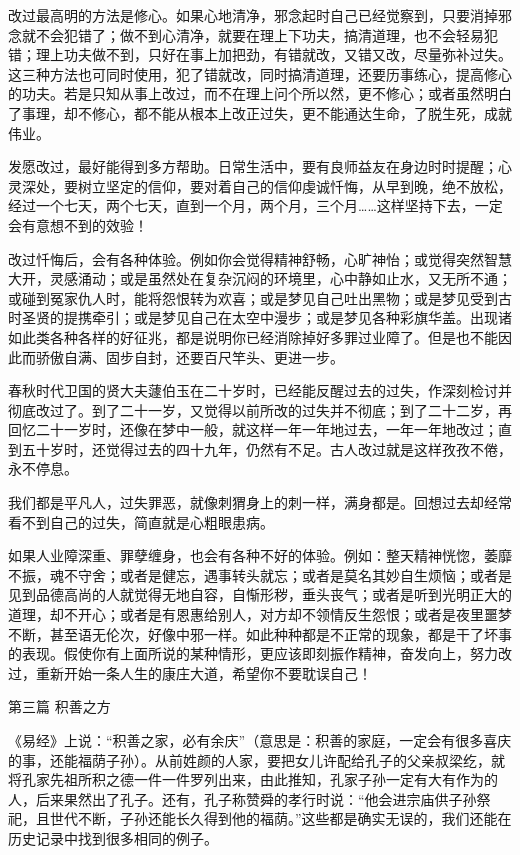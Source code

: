 \documentclass[12pt,UTF8]{ctexbook}
\begin{document}
改过最高明的方法是修心。如果心地清净，邪念起时自己已经觉察到，只要消掉邪念就不会犯错了；做不到心清净，就要在理上下功夫，搞清道理，也不会轻易犯错；理上功夫做不到，只好在事上加把劲，有错就改，又错又改，尽量弥补过失。这三种方法也可同时使用，犯了错就改，同时搞清道理，还要历事练心，提高修心的功夫。若是只知从事上改过，而不在理上问个所以然，更不修心；或者虽然明白了事理，却不修心，都不能从根本上改正过失，更不能通达生命，了脱生死，成就伟业。

发愿改过，最好能得到多方帮助。日常生活中，要有良师益友在身边时时提醒；心灵深处，要树立坚定的信仰，要对着自己的信仰虔诚忏悔，从早到晚，绝不放松，经过一个七天，两个七天，直到一个月，两个月，三个月……这样坚持下去，一定会有意想不到的效验！

改过忏悔后，会有各种体验。例如你会觉得精神舒畅，心旷神怡；或觉得突然智慧大开，灵感涌动；或是虽然处在复杂沉闷的环境里，心中静如止水，又无所不通；或碰到冤家仇人时，能将怨恨转为欢喜；或是梦见自己吐出黑物；或是梦见受到古时圣贤的提携牵引；或是梦见自己在太空中漫步；或是梦见各种彩旗华盖。出现诸如此类各种各样的好征兆，都是说明你已经消除掉好多罪过业障了。但是也不能因此而骄傲自满、固步自封，还要百尺竿头、更进一步。

春秋时代卫国的贤大夫蘧伯玉在二十岁时，已经能反醒过去的过失，作深刻检讨并彻底改过了。到了二十一岁，又觉得以前所改的过失并不彻底；到了二十二岁，再回忆二十一岁时，还像在梦中一般，就这样一年一年地过去，一年一年地改过；直到五十岁时，还觉得过去的四十九年，仍然有不足。古人改过就是这样孜孜不倦，永不停息。

我们都是平凡人，过失罪恶，就像刺猬身上的刺一样，满身都是。回想过去却经常看不到自己的过失，简直就是心粗眼患病。

如果人业障深重、罪孽缠身，也会有各种不好的体验。例如：整天精神恍惚，萎靡不振，魂不守舍；或者是健忘，遇事转头就忘；或者是莫名其妙自生烦恼；或者是见到品德高尚的人就觉得无地自容，自惭形秽，垂头丧气；或者是听到光明正大的道理，却不开心；或者是有恩惠给别人，对方却不领情反生怨恨；或者是夜里噩梦不断，甚至语无伦次，好像中邪一样。如此种种都是不正常的现象，都是干了坏事的表现。假使你有上面所说的某种情形，更应该即刻振作精神，奋发向上，努力改过，重新开始一条人生的康庄大道，希望你不要耽误自己！

第三篇 积善之方

《易经》上说：“积善之家，必有余庆”（意思是：积善的家庭，一定会有很多喜庆的事，还能福荫子孙）。从前姓颜的人家，要把女儿许配给孔子的父亲叔梁纥，就将孔家先祖所积之德一件一件罗列出来，由此推知，孔家子孙一定有大有作为的人，后来果然出了孔子。还有，孔子称赞舜的孝行时说：“他会进宗庙供子孙祭祀，且世代不断，子孙还能长久得到他的福荫。”这些都是确实无误的，我们还能在历史记录中找到很多相同的例子。
\end{document}
